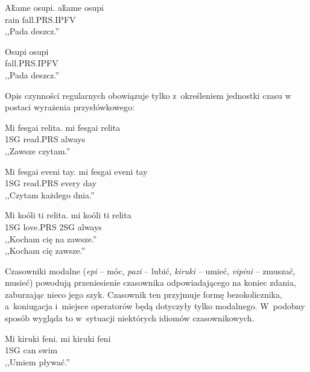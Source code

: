 \begin{spacing}{1.1}

\begin{exe}
	\ex
	\trans Aḱame osupi.
	\gll  aḱame osupi \\
	  rain fall.PRS.IPFV \\
	\glt  ,,Pada deszcz.''
\end{exe}

\begin{exe}
	\ex
	\trans Osupi
	\gll  osupi \\
	  fall.PRS.IPFV \\
	\glt  ,,Pada deszcz.''
\end{exe}

Opis czynności regularnych obowiązuje tylko z~określeniem jednostki czasu w
postaci wyrażenia przysłówkowego:

\begin{exe}
	\ex
	\trans Mi fesgai relita.
	\gll  mi fesgai relita \\
	  1SG read.PRS always \\
	\glt  ,,Zawsze czytam.''
\end{exe}

\begin{exe}
	\ex
	\trans Mi fesgai eveni tay.
	\gll  mi fesgai eveni tay\\
	  1SG read.PRS every day \\
	\glt  ,,Czytam każdego dnia.''
\end{exe}

\begin{exe}
	\ex
	\trans Mi koóli ti relita.
	\gll  mi koóli ti relita\\
	  1SG love.PRS 2SG always \\
	\glt  ,,Kocham cię na zawsze.'' \\ ,,Kocham cię zawsze.''
\end{exe}

Czasowniki modalne (\emph{epi} -- móc, \emph{pazi} -- lubić, \emph{kiruki} --
umieć, \emph{vipini} -- zmuszać, musieć) powodują przeniesienie czasownika
odpowiadającego na koniec zdania, zaburzając nieco jego szyk. Czasownik ten
przyjmuje formę bezokolicznika, a~koniugacja i~miejsce operatorów będą dotyczyły
tylko modalnego. W~podobny sposób wygląda to w~sytuacji niektórych idiomów
czasownikowych.

\begin{exe}
	\ex
	\trans Mi kiruki feni.
	\gll  mi kiruki feni\\
	  1SG can swim \\
	\glt  ,,Umiem pływać.''
\end{exe}


\end{spacing}
